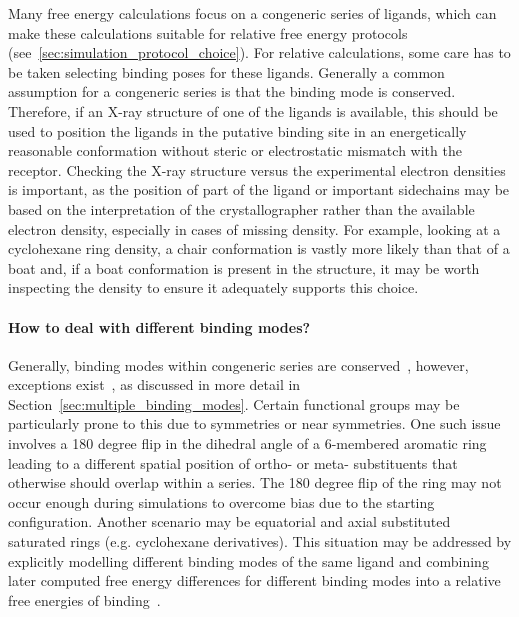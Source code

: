 \documentclass[9pt,bestpractices]{livecoms}
\begin{document}
Many free energy calculations focus on a congeneric series of ligands, which can make these calculations suitable for relative free energy protocols (see~\ref{sec:simulation_protocol_choice}). For relative calculations, some care has to be taken selecting binding poses for these ligands. Generally a common assumption for a congeneric series is that the binding mode is conserved. Therefore, if an X-ray structure of one of the ligands is available, this should be used to position the ligands in the putative binding site in an energetically reasonable conformation without steric or electrostatic mismatch with the receptor. Checking the X-ray structure versus the experimental electron densities is important, as the position of part of the ligand or important sidechains may be based on the interpretation of the crystallographer rather than the available electron density, especially in cases of missing density. For example, looking at a cyclohexane ring density, a chair conformation is vastly more likely than that of a boat and, if a boat conformation is present in the structure, it may be worth inspecting the density to ensure it adequately supports this choice. 

\paragraph{How to deal with different binding modes?}
Generally, binding modes within congeneric series are conserved~\cite{wacker2010conserved}, however, exceptions exist~\cite{brandt2011congeneric,nazare2005probing}, as discussed in more detail in Section~\ref{sec:multiple_binding_modes}. Certain  functional groups may be particularly prone to this due to symmetries or near symmetries. One such issue involves a 180 degree flip in the dihedral angle of a 6-membered aromatic ring leading to a different spatial position of ortho- or meta- substituents that otherwise should overlap within a series. The 180 degree flip of the ring may not occur enough during simulations to overcome bias due to the starting configuration. Another scenario may be equatorial and axial substituted saturated rings (e.g. cyclohexane derivatives). This situation may be addressed by explicitly modelling different binding modes of the same ligand and combining later computed free energy differences for different binding modes into a relative free energies of binding~\cite{kaus2015how}.
%
\end{document}

